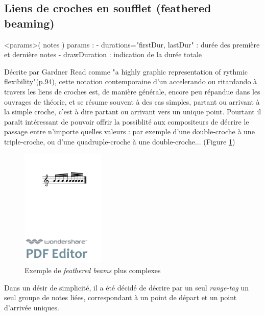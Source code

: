 \documentclass{article}
\newenvironment{gmncode}	{\vspace{-2mm}\small\verbatim}{\endverbatim\vspace{-2mm}}
\begin{document}
\subsection{Liens de croches en soufflet (feathered beaming)}\label{subsec:featheredBeaming}
\bigskip

\begin{gmncode}
\fBeam<params>( notes )
  params : 
    - durations="firstDur, lastDur" : 
      durée des première et dernière notes
    - drawDuration : 
      indication de la durée totale

\end{gmncode}

Décrite par Gardner Read \cite{read1969music} comme "a highly graphic representation of rythmic flexibility"(p.94), cette notation contemporaine d'un accelerando ou ritardando à travers les liens de croches est, de manière générale, encore peu répandue dans les ouvrages de théorie, et se résume souvent à des cas simples, partant ou arrivant à la simple croche, c'est à dire partant ou arrivant vers un unique point. Pourtant il paraît intéressant de pouvoir offrir la possiblité aux compositeurs de décrire le passage entre n'importe quelles valeurs : par exemple d'une double-croche à une triple-croche, ou d'une quadruple-croche à une double-croche... (Figure \ref{fig:fbeamcomplex})

\begin{figure}[h]
\centering
\includegraphics[width=40mm]{img/fbeamcomplex.pdf}
\caption{Exemple de \emph{feathered beams} plus complexes}
\label{fig:fbeamcomplex}
\end{figure}

Dans un désir de simplicité, il a été décidé de décrire par un seul \emph{range-tag} un seul groupe de notes liées, correspondant à un point de départ et un point d'arrivée uniques.
\end{document}
